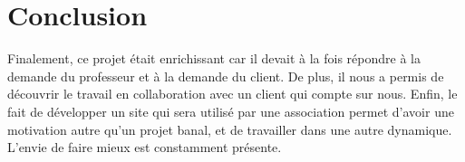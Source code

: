 \documentclass[11pt,a4paper,titlepage]{report}
\begin{document}
\chapter*{Conclusion}
Finalement, ce projet était enrichissant car il devait à la fois répondre à la demande du professeur et à la demande du client. 
De plus, il nous a permis de découvrir le travail en collaboration avec un client qui compte sur nous. 
Enfin, le fait de développer un site qui sera utilisé par une association permet d'avoir une motivation autre qu'un projet banal, et de travailler dans une autre dynamique. L'envie de faire mieux est constamment présente.
\end{document}
